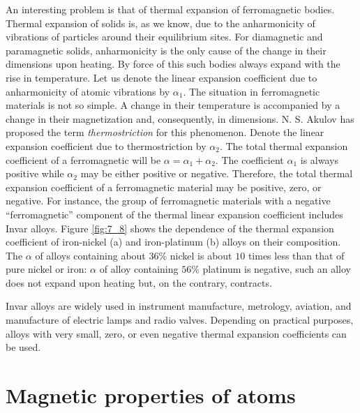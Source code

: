 An interesting problem is that of thermal expansion of ferromagnetic bodies. Thermal expansion of solids is, as we know, due to the anharmonicity of vibrations of particles around their equilibrium sites. For diamagnetic and paramagnetic solids, anharmonicity is the only cause of the change in their dimensions upon heating. By force of this such bodies always expand with the rise in temperature. Let us denote the linear expansion coefficient due to anharmonicity of atomic vibrations by $\alpha_1$. The situation in ferromagnetic materials is not so simple. A change in their temperature is accompanied by a change in their magnetization and, consequently, in dimensions. N. S. Akulov has proposed the term \textit{thermostriction} for this phenomenon. Denote the linear expansion coefficient due to thermostriction by $\alpha_2$. The total thermal expansion coefficient of a ferromagnetic will be $\alpha=\alpha_1+\alpha_2$. The coefficient $\alpha_1$ is always positive while $\alpha_2$ may be either positive or negative. Therefore, the total thermal expansion coefficient of a ferromagnetic material may be positive, zero, or negative. For instance, the group of ferromagnetic materials with a negative ``ferromagnetic'' component of the thermal linear expansion coefficient includes Invar alloys. Figure \ref{fig:7_8} shows the dependence of the thermal expansion coefficient of iron-nickel (a) and iron-platinum (b) alloys on their composition. The $\alpha$ of alloys containing about $36\%$ nickel is about $10$ times less than that of pure nickel or iron: $\alpha$ of alloy containing $56\%$ platinum is negative, such an alloy does not expand upon heating but, on the contrary, contracts.

Invar alloys are widely used in instrument manufacture, metrology, aviation, and manufacture of electric lamps and radio valves. Depending on practical purposes, alloys with very small, zero, or even negative thermal expansion coefficients can be used.

\section{Magnetic properties of atoms}\label{sec:65}

